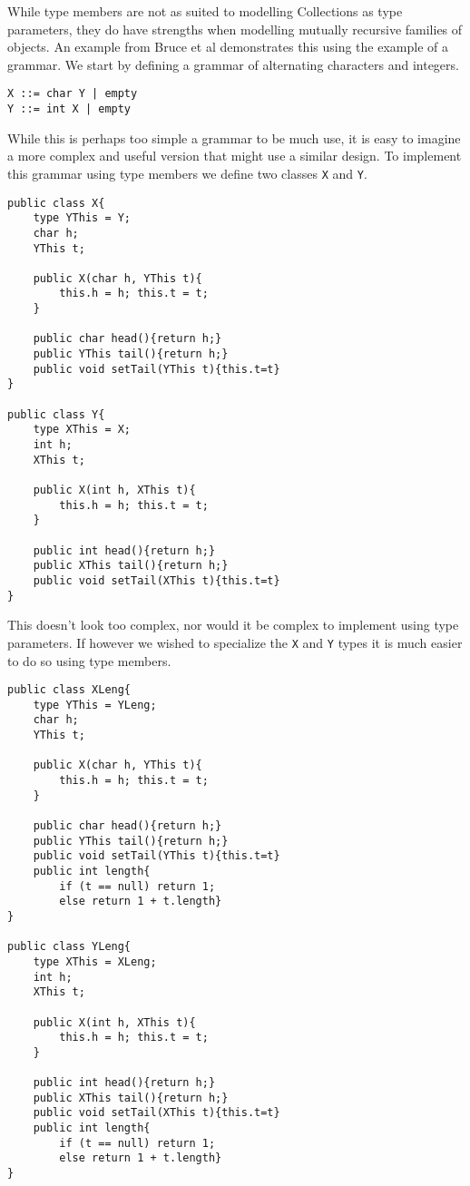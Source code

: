 \documentclass[11pt
              , a4paper
              , twoside
              , openright
              ]{report}
\numberwithin{case}{theorem}
\numberwithin{subcase}{case}
\begin{document}
While type members are not as suited to modelling Collections as type parameters, they do have strengths when modelling mutually recursive families of objects. An example from Bruce et al \cite{Bruce:1998:SSA:646155.679691} demonstrates this using the example of a grammar. We start by defining a  grammar of alternating characters and integers.
\begin{lstlisting}[mathescape, style=customlang]
X ::= char Y | empty
Y ::= int X | empty
\end{lstlisting}
While this is perhaps too simple a grammar to be much use, it is easy to imagine a more complex and useful version that might use a similar design. To implement this grammar using type members we define two classes \verb|X| and \verb|Y|. 
\begin{lstlisting}[mathescape, style=customlang]
public class X{
	type YThis = Y;
	char h;
	YThis t;

	public X(char h, YThis t){
		this.h = h; this.t = t;
	}
	
	public char head(){return h;}
	public YThis tail(){return h;}
	public void setTail(YThis t){this.t=t}
}

public class Y{
	type XThis = X;
	int h;
	XThis t;

	public X(int h, XThis t){
		this.h = h; this.t = t;
	}
	
	public int head(){return h;}
	public XThis tail(){return h;}
	public void setTail(XThis t){this.t=t}
}
\end{lstlisting}
This doesn't look too complex, nor would it be complex to implement using type parameters. If however we wished to specialize the \verb|X| and \verb|Y| types it is much easier to do so using type members.
\begin{lstlisting}[mathescape, style=customlang]
public class XLeng{
	type YThis = YLeng;
	char h;
	YThis t;

	public X(char h, YThis t){
		this.h = h; this.t = t;
	}
	
	public char head(){return h;}
	public YThis tail(){return h;}
	public void setTail(YThis t){this.t=t}
	public int length{
		if (t == null) return 1; 
		else return 1 + t.length}
}

public class YLeng{
	type XThis = XLeng;
	int h;
	XThis t;

	public X(int h, XThis t){
		this.h = h; this.t = t;
	}
	
	public int head(){return h;}
	public XThis tail(){return h;}
	public void setTail(XThis t){this.t=t}
	public int length{
		if (t == null) return 1; 
		else return 1 + t.length}
}
\end{lstlisting}
\end{document}

